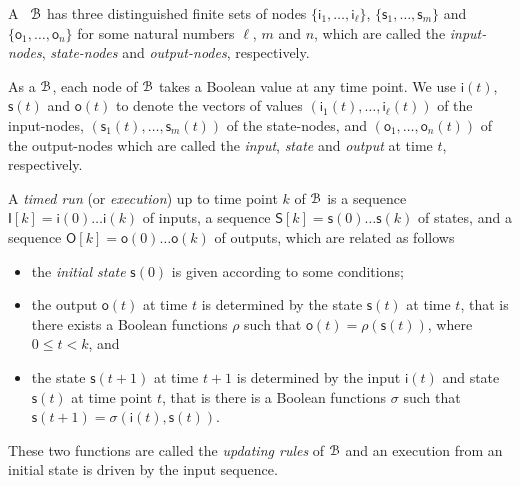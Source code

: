 A \BCN\  ${\mathcal{B}}$ has three distinguished finite sets of nodes $\{\mathsf{i}_1,\ldots, \mathsf{i}_\ell\}$, $\{\mathsf{s}_1,\ldots,\mathsf{s}_m\}$ and $\{\mathsf{o}_1,\ldots, \mathsf{o}_n\}$ for some natural numbers $\ell$, $m$ and $n$, which are called the {\em input-nodes}, {\em state-nodes}  and {\em output-nodes}, respectively. 

As a {\BCN} ${\mathcal{B}}$, each node of   ${\mathcal{B}}$   takes a Boolean value at any time point. We use $\mathsf{i}(t)$, $\mathsf{s}(t)$ and $\mathsf{o}(t)$  to denote the vectors of values $(\mathsf{i}_1(t),\ldots,\mathsf{i}_\ell(t))$ of the input-nodes,  $(\mathsf{s}_1(t),\ldots,\mathsf{s}_m(t))$ of the state-nodes, and $(\mathsf{o}_1,\ldots,\mathsf{o}_n(t))$ of the output-nodes  which are called the {\em input}, {\em state} and {\em output} at time $t$, respectively.

A {\em timed run}  (or {\em execution}) up to time point $k$ of  ${\mathcal{B}}$ is a sequence $\mathsf{I}[k] = \mathsf{i}(0)\ldots \mathsf{i}(k)$ of inputs, a sequence $\mathsf{S}[k] = \mathsf{s}(0)\ldots \mathsf{s}(k)$ of states, and a sequence $\mathsf{O}[k] = \mathsf{o}(0)\ldots \mathsf{o}(k)$  of outputs, which are related as follows

\begin{itemize}
\item the {\em initial state} $\mathsf{s}(0)$ is given according to some conditions;
	\item the output $\mathsf{o}(t)$ at time $t$ is determined by the state $\mathsf{s}(t)$ at time $t$, that is there exists a Boolean functions $\rho$ such that $\mathsf{o}(t)=\rho(\mathsf{s}(t))$, where $0\le t<k$, and  
	\item the state $\mathsf{s}(t+1)$ at time $t+1$ is determined by the input $\mathsf{i}(t)$ and state $\mathsf{s}(t)$ at time point $t$, that is there is a Boolean functions $\sigma$ such that $\mathsf{s}(t+1)=\sigma(\mathsf{i}(t),\mathsf{s}(t))$.
\end{itemize}
 These two functions are called the {\em updating rules} of ${\mathcal{B}}$ and an execution from an initial state is driven by the input sequence.
 
